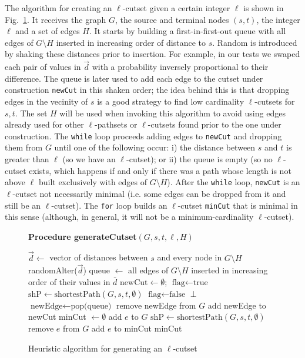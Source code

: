 \documentclass[a4paper]{article}
\newcommand{\ele}{{\ell}}
\begin{document}
The algorithm for creating an $\ele$-cutset given a certain integer $\ele$ is shown in Fig.~\ref{algo:generateCutset}. It  receives the graph $G$, the source and terminal nodes $(s,t)$, the integer $\ele$ and a set of edges $H$. It starts by building a first-in-first-out queue with all edges of $G\setminus H$ inserted in increasing order of distance to $s$. Random is introduced by shaking these distances prior to insertion. For example, in our tests we swaped each pair of values in $\vec{d}$ with a probability inversely proportional to their difference. The queue is later used to add each edge to the cutset under construction {\tt newCut} in this shaken order; the idea behind this is that dropping edges in the vecinity of $s$ is a good strategy to find low cardinality $\ele$-cutsets for $s,t$. The set $H$ will be used when invoking this algorithm  to avoid using edges already used for other $\ele$-pathsets or $\ele$-cutsets found prior to the one under construction. The {\tt while} loop proceeds adding edges to {\tt newCut} and dropping them from $G$ until one of the following occur: i) the distance between $s$ and $t$ is greater than $\ele$ (so we have an $\ele$-cutset); or ii) the queue is empty (so no $\ele$-cutset exists, which happens if and only if there was a path whose length is not above $\ele$ built exclusively with edges of $G\setminus H$). After the {\tt while} loop, {\tt newCut} is an $\ele$-cutset not necessarily minimal (i.e. some edges can be dropped from it and still be an $\ele$-cutset). The {\tt for} loop builds an $\ele$-cutset {\tt minCut} that is minimal in this sense (although, in general, it will not be a minimum-cardinality $\ele$-cutset).

\begin{figure}
\textbf{Procedure generateCutset$(G, s, t, \ele, H)$}
\begin{center}
\begin{algorithmic}[1]
\STATE $\vec{d} \leftarrow$ vector of distances between $s$ and every node in $G\setminus H$
\STATE randomAlter($\vec{d}$)
\STATE queue $\leftarrow$ all edges of $G{\setminus}H$ inserted in increasing order of their values in $\bar{d}$
\STATE $\text{newCut} \leftarrow \emptyset$; $\text{flag} \leftarrow \text{true}$
	\STATE $\text{shP} \leftarrow \text{shortestPath}(G, s, t, \emptyset)$
	\IF {$(\text{shP} = \bot) \vee (\text{length(shP)} > \ele)$}
		\STATE $\text{flag} \leftarrow \text{false}$
		\RETURN $\bot$
	\ELSE
		\STATE $\text{newEdge} \leftarrow \text{pop(queue)}$
		\STATE remove newEdge from $G$
		\STATE add newEdge to newCut
	\ENDIF
\ENDWHILE
\STATE minCut $\leftarrow \emptyset$
	\STATE add $e$ to $G$
	\STATE $\text{shP} \leftarrow \text{shortestPath}(G, s,t,\emptyset)$
	\IF {$(\text{shP} \neq \bot) \wedge (\text{length(shP)}\leq \ele)$}
		\STATE remove $e$ from $G$
		\STATE add $e$ to minCut
	\ENDIF
\ENDFOR
\RETURN minCut
\end{algorithmic}
\end{center}
\caption{Heuristic algorithm for generating an $\ele$-cutset}
\label{algo:generateCutset}
\end{figure}
\end{document}
